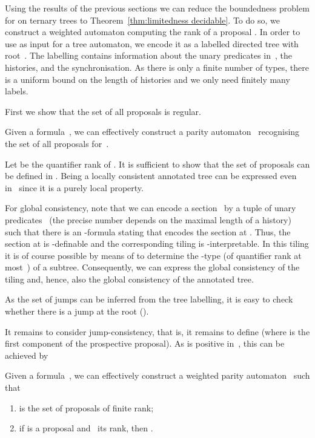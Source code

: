 \documentclass{LMCS}
\begin{document}
\medskip
Using the results of the previous sections we can reduce
the boundedness problem for  on ternary trees
to Theorem~\ref{thm:limitedness decidable}.
To do so, we construct a weighted automaton computing the rank of a proposal
.
In order to use  as input for a tree automaton,
we encode it as a labelled directed tree with root~.
The labelling contains information about the unary predicates in~,
the histories, and the synchronisation.
As there is only a finite number of types,
there is a uniform bound on the length of histories
and we only need finitely many labels.

First we show that the set of all proposals is regular.
\begin{lem}\label{lem: proposals are regular}
Given a formula~,
we can effectively construct a parity automaton~ recognising
the set of all proposals for~.
\end{lem}

\proof
Let  be the quantifier rank of .
It is sufficient to show that the set of proposals can be defined in .
Being a locally consistent annotated tree can be expressed even in~
since it is a purely local property.

For global consistency, note that we can encode a section~
by a tuple of unary predicates~
(the precise number depends on the maximal length of a history)
such that there is an -formula 
stating that  encodes the section at .
Thus, the section at  is -definable and
the corresponding tiling is -interpretable.
In this tiling it is of course possible by means of 
to determine the -type (of quantifier rank at most~) of a subtree.
Consequently, we can express the global consistency of the tiling
and, hence, also the global consistency of the annotated tree.

As the set of jumps can be inferred from the tree labelling,
it is easy to check whether there is a jump at the root ().

It remains to consider jump-consistency,
that is, it remains to define 
(where  is the first component of the prospective proposal).
As  is positive in~, this can be achieved by



\begin{lem}\label{lem: proposals and automata}
Given a formula~,
we can effectively construct a weighted parity automaton~ such that
\begin{enumerate}
\item  is the set of proposals of finite rank\?;
\item if  is a proposal and ~its rank,
  then .
\end{enumerate}
\end{lem}
\end{document}
